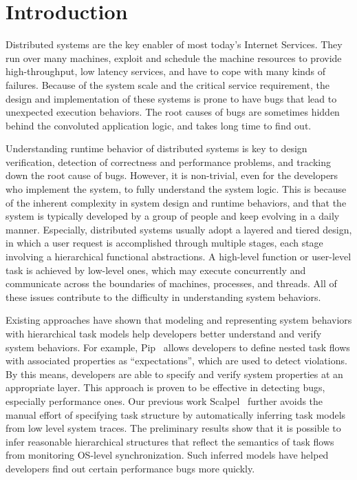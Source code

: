 
\section{Introduction}
\label{sec:intro}



Distributed systems are the key enabler of most
today's Internet Services. They run over many machines,
exploit and schedule the machine resources to provide
high-throughput, low latency services, and have to cope
with many kinds of failures. Because of the system scale
and the critical service requirement, the design and
implementation of these systems is prone to have bugs
that lead to unexpected execution behaviors.
The root causes of bugs are sometimes hidden behind
the convoluted application logic, and takes long time
to find out.

Understanding runtime behavior of distributed systems
is key to design verification, detection of correctness
and performance problems, and tracking down the root cause
of bugs. However, it is non-trivial, even for the developers
who implement the system, to fully understand the system
logic. This is because of the inherent complexity
in system design and runtime behaviors, and that
the system is typically developed by a group of people
and keep evolving in a daily manner.
Especially, distributed systems usually adopt a layered
and tiered design, in which a user request is accomplished
through multiple stages, each stage involving a hierarchical
functional abstractions. A high-level function or user-level
task is achieved by low-level ones, which may execute
concurrently and communicate across the boundaries of machines,
processes, and threads. All of these issues contribute to the
difficulty in understanding system behaviors.

Existing approaches have shown that modeling and representing
system behaviors with hierarchical task models help developers
better understand and verify system behaviors. For example,
Pip~\cite{} allows developers to define nested task flows
with associated properties as ``expectations'', which are used
to detect violations.
By this means, developers are able to specify and verify
system properties at an appropriate layer. This approach is
proven to be effective in detecting bugs, especially
performance ones. Our previous work Scalpel~\cite{}
further avoids the manual effort of specifying task structure
by automatically inferring task models from low level
system traces. The preliminary results show that it is
possible to infer reasonable hierarchical structures that reflect
the semantics of task flows from monitoring OS-level synchronization.
Such inferred models have helped developers find out
certain performance bugs more quickly.

